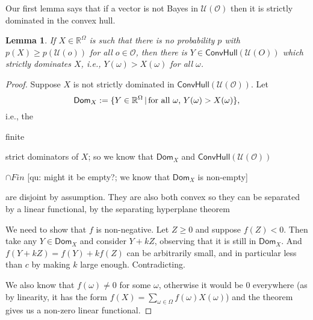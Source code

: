 \documentclass[a4paper]{article}
\newtheorem{lemma}[theorem]{Lemma}
\renewcommand\O{\mathcal{O}}
\newcommand\Uwald{\mathcal{U}} %
\newcommand{\Dom}{\mathsf{Dom}}
\renewcommand{\Re}{\mathbb{R}}
\newcommand{\Conv}{\mathsf{ConvHull}}
\newcommand\SetDelimiter[1][]{
	\nonscript\,#1\vert \allowbreak \nonscript\,\mathopen{}}
\providecommand\given{\SetDelimiter}
\renewcommand{\geq}{\geqslant}
\newenvironment{CCM rewritten}
{\begingroup\color{blue}} %
{\endgroup}              %
\begin{document}
	Our first lemma says that if a vector is not Bayes in $\Uwald(\O)$ then it is strictly dominated in the convex hull.
	\begin{lemma}\label{thm:cct:admiss in conv are Bayes in conv}
		If $X\in\Re^\Omega$ is such that there is no probability $p$ with $p(X)\geq p(\Uwald(o))$ for all $o\in\O$, then there is $Y\in\Conv(\Uwald(O))$ which strictly dominates $X$, i.e., $Y(\omega)>X(\omega)$ for all $\omega$.
	\end{lemma}
	\begin{proof}
		Suppose $X$ is not strictly dominated in $\Conv(\Uwald(\O))$. 
		Let $$\Dom_X :=\{Y\in \Re^\Omega\given \text{for all $\omega$, }Y(\omega)>X(\omega)\},$$ i.e., the \begin{infversion}
			finite
		\end{infversion} strict dominators of $X$; so we know that $\Dom_X $ and $\Conv(\Uwald(\O))$ \begin{infversion}
			$\cap Fin$ [qu: might it be empty?; we know that $\Dom_X $ is non-empty]
		\end{infversion}are disjoint by assumption. They are also both convex so they can be separated by a linear functional, by the separating hyperplane theorem  

		
		We need to show that $f$ is non-negative. Let $Z\geq 0$ and suppose $f(Z)<0$. Then take any $Y\in \Dom_X $ and consider $Y+kZ$, observing that it is still in $\Dom_X $. And $f(Y+kZ)=f(Y)+kf(Z)$ can be arbitrarily small, and in particular less than $c$ by making $k$ large enough. Contradicting. 
		
		We also know that $f(\omega)\neq 0$ for some $\omega$, otherwise it would be $0$ everywhere (as by linearity, it has the form $f(X)=\sum_{\omega\in\Omega}f(\omega)X(\omega)$) and the theorem gives us a non-zero linear functional.
		

\end{proof}
\end{document}
